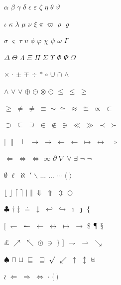 \documentclass{article}
\begin{document}
$\alpha$ $\beta$ $\gamma$ $\delta$ $\epsilon$ $\varepsilon$ $\zeta$ $\eta$ $\theta$ $\vartheta$

$\iota$ $\kappa$ $\lambda$ $\mu$ $\nu$ $\xi$ $\pi$ $\varpi$ $\rho$ $\varrho$

$\sigma$ $\varsigma$ $\tau$ $\upsilon$ $\phi$ $\varphi$ $\chi$ $\psi$ $\omega$ $\Gamma$

$\Delta$ $\Theta$ $\Lambda$ $\Xi$ $\Pi$ $\Sigma$ $\Upsilon$ $\Phi$ $\Psi$ $\Omega$

$\times$ $\cdot$ $\pm$ $\mp$ $\div$ $\ast$ $\circ$ $\cup$ $\cap$ $\wedge$

$\land$ $\vee$ $\lor$ $\oplus$ $\ominus$ $\otimes$ $\odot$ $\le$ $\leq$ $\ge$

$\geq$ $\ne$ $\neq$ $\equiv$ $\sim$ $\simeq$ $\approx$ $\cong$ $\propto$ $\subset$

$\supset$ $\subseteq$ $\supseteq$ $\in$ $\notin$ $\ni$ $\ll$ $\gg$ $\prec$ $\succ$

$\mid$ $\parallel$ $\perp$ $\to$ $\rightarrow$ $\leftarrow$ $\gets$ $\mapsto$ $\leftrightarrow$ $\Rightarrow$

$\Leftarrow$ $\Leftrightarrow$ $\iff$ $\infty$ $\partial$ $\nabla$ $\forall$ $\exists$ $\neg$ $\lnot$

$\emptyset$ $\ell$ $\aleph$ $\prime$ $\backslash$ $\ldots$ $\dots$ $\cdots$ $\langle$ $\rangle$

$\lfloor$ $\rfloor$ $\lceil$ $\rceil$ $\vert$ $\Vert$ $\Downarrow$ $\Uparrow$ $\Updownarrow$ $\bigcirc$

$\clubsuit$ $\dagger$ $\ddagger$ $\doteq$ $\downarrow$ $\hookleftarrow$ $\hookrightarrow$ $\imath$ $\jmath$ $\lbrace$

$\lbrack$ $\leftharpoondown$ $\leftharpoonup$ $\longleftarrow$ $\longleftrightarrow$ $\longmapsto$ $\longrightarrow$ $\mathdollar$ $\mathparagraph$ $\mathsection$

$\mathsterling$ $\nearrow$ $\nwarrow$ $\oslash$ $\owns$ $\rbrace$ $\rbrack$ $\rightharpoondown$ $\rightharpoonup$ $\searrow$

$\spadesuit$ $\sqcap$ $\sqcup$ $\sqsubseteq$ $\sqsupseteq$ $\surd$ $\swarrow$ $\uparrow$ $\updownarrow$ $\uplus$

$\wr$ $\Longleftarrow$ $\Longrightarrow$ $\Longleftrightarrow$ $\cdotp$ $\lgroup$ $\rgroup$
\end{document}
